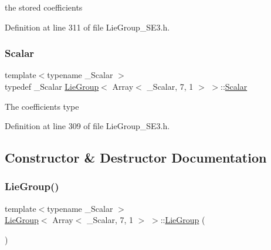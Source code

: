 the stored coefficients 

Definition at line 311 of file Lie\+Group\+\_\+\+S\+E3.\+h.

\hypertarget{class_lie_group_3_01_array_3_01___scalar_00_017_00_011_01_4_01_4_a5fd29a7be3621d5df2717d910d47b3ce}{}\label{class_lie_group_3_01_array_3_01___scalar_00_017_00_011_01_4_01_4_a5fd29a7be3621d5df2717d910d47b3ce} 
\subsubsection{\texorpdfstring{Scalar}{Scalar}}
{\footnotesize\ttfamily template$<$typename \+\_\+\+Scalar $>$ \\
typedef \+\_\+\+Scalar \hyperlink{class_lie_group}{Lie\+Group}$<$ Array$<$ \+\_\+\+Scalar, 7, 1 $>$ $>$\+::\hyperlink{class_lie_group_3_01_array_3_01___scalar_00_017_00_011_01_4_01_4_a5fd29a7be3621d5df2717d910d47b3ce}{Scalar}}

The coefficients type 

Definition at line 309 of file Lie\+Group\+\_\+\+S\+E3.\+h.



\subsection{Constructor \& Destructor Documentation}
\hypertarget{class_lie_group_3_01_array_3_01___scalar_00_017_00_011_01_4_01_4_a5f6d9e49b663a718f984052f5925a084}{}\label{class_lie_group_3_01_array_3_01___scalar_00_017_00_011_01_4_01_4_a5f6d9e49b663a718f984052f5925a084} 
\subsubsection{\texorpdfstring{Lie\+Group()}{LieGroup()}\hspace{0.1cm}{\footnotesize\ttfamily [1/6]}}
{\footnotesize\ttfamily template$<$typename \+\_\+\+Scalar $>$ \\
\hyperlink{class_lie_group}{Lie\+Group}$<$ Array$<$ \+\_\+\+Scalar, 7, 1 $>$ $>$\+::\hyperlink{class_lie_group}{Lie\+Group} (\begin{DoxyParamCaption}{ }\end{DoxyParamCaption})\hspace{0.3cm}{\ttfamily [inline]}}


